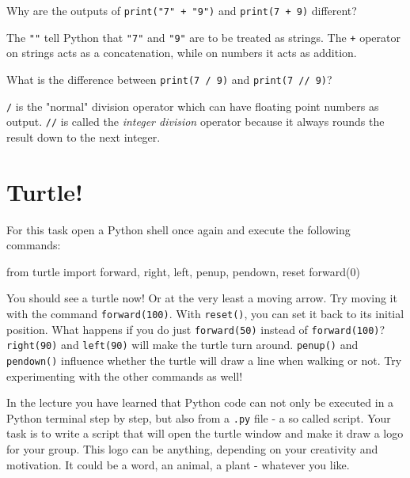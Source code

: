 Why are the outputs of \texttt{print("7" + "9")} and \texttt{print(7 + 9)} different?

\vspace {1em}

\begin{solution}
    The \texttt{""} tell Python that \texttt{"7"} and \texttt{"9"} are to be treated as strings. The \texttt{+} operator on strings acts as a concatenation, while on numbers it acts as addition.
\end{solution}

\vspace{1em}

\noindent What is the difference between \texttt{print(7 / 9)} and \texttt{print(7 // 9)}?

\begin{solution}
    \texttt{/} is the "normal" division operator which can have floating point numbers as output. \texttt{//} is called the \textit{integer division} operator because it always rounds the result down to the next integer.
\end{solution}

\section{Turtle!}

For this task open a Python shell once again and execute the following commands:

\begin{pythoncode}

from turtle import forward, right, left, penup, pendown, reset
forward(0)

\end{pythoncode}

\noindent You should see a turtle now! Or at the very least a moving arrow. Try moving it with the command \texttt{forward(100)}.
With \texttt{reset()}, you can set it back to its initial position. What happens if you do just \texttt{forward(50)} instead of \texttt{forward(100)}?
\texttt{right(90)} and \texttt{left(90)} will make the turtle turn around. \texttt{penup()} and \texttt{pendown()} influence whether the turtle will draw a line when walking or not. Try experimenting with the other commands as well!

\vspace{1em}

\noindent In the lecture you have learned that Python code can not only be executed in a Python terminal step by step, but also from a \texttt{.py} file - a so called script. Your task is to write a script that will open the turtle window and make it draw a logo for your group. This logo can be anything, depending on your creativity and motivation. It could be a word, an animal, a plant - whatever you like.

